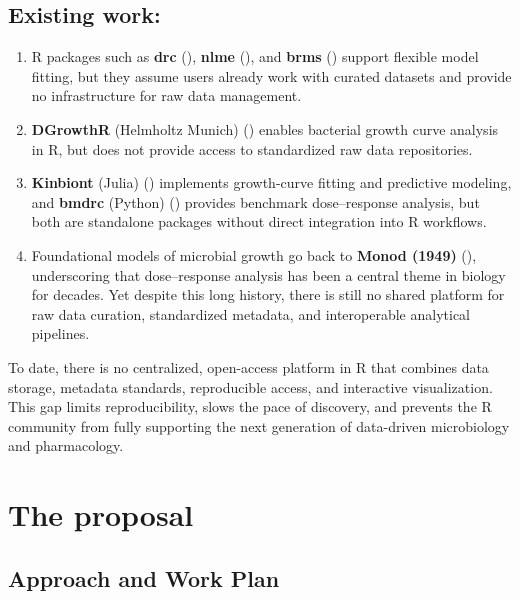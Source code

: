 \documentclass[
]{article}
\providecommand{\tightlist}{%
  \setlength{\itemsep}{0pt}\setlength{\parskip}{0pt}}
\begin{document}
\subsection{Existing work:}\label{existing-work}

\begin{enumerate}
\def\labelenumi{\arabic{enumi}.}
\tightlist
\item
  R packages such as \textbf{drc} (), \textbf{nlme} (), and \textbf{brms} ()
  support flexible model fitting, but they assume users already work
  with curated datasets and provide no infrastructure for raw data
  management.
\item
  \textbf{DGrowthR} (Helmholtz Munich) () enables bacterial growth curve analysis in R,
  but does not provide access to standardized raw data repositories.
\item
  \textbf{Kinbiont} (Julia) ()
  implements growth-curve fitting and predictive modeling, and
  \textbf{bmdrc} (Python) ()
  provides benchmark dose--response analysis, but both are standalone
  packages without direct integration into R workflows.
\item
  Foundational models of microbial growth go back to \textbf{Monod
  (1949)} (), underscoring that
  dose--response analysis has been a central theme in biology for
  decades. Yet despite this long history, there is still no shared
  platform for raw data curation, standardized metadata, and
  interoperable analytical pipelines.
\end{enumerate}

To date, there is no centralized, open-access platform in R that
combines data storage, metadata standards, reproducible access, and
interactive visualization. This gap limits reproducibility, slows the
pace of discovery, and prevents the R community from fully supporting
the next generation of data-driven microbiology and pharmacology.

\section{The proposal}\label{the-proposal}

\subsection{Approach and Work Plan}\label{approach-and-work-plan}
\end{document}
